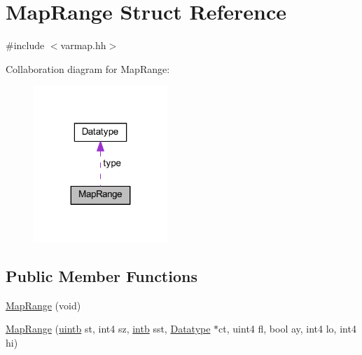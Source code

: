 \hypertarget{struct_map_range}{}\section{Map\+Range Struct Reference}
\label{struct_map_range}


{\ttfamily \#include $<$varmap.\+hh$>$}



Collaboration diagram for Map\+Range\+:
\nopagebreak
\begin{figure}[H]
\begin{center}
\leavevmode
\includegraphics[width=143pt]{struct_map_range__coll__graph}
\end{center}
\end{figure}
\subsection*{Public Member Functions}
\begin{DoxyCompactItemize}
\item 
\mbox{\hyperlink{struct_map_range_a819c683a1de6677ad4da86f1e9d9027e}{Map\+Range}} (void)
\item 
\mbox{\hyperlink{struct_map_range_a49fce86d8908927a7e31dd3724c62e10}{Map\+Range}} (\mbox{\hyperlink{types_8h_a2db313c5d32a12b01d26ac9b3bca178f}{uintb}} st, int4 sz, \mbox{\hyperlink{types_8h_aa925ba3e627c2df89d5b1cfe84fb8572}{intb}} sst, \mbox{\hyperlink{class_datatype}{Datatype}} $\ast$ct, uint4 fl, bool ay, int4 lo, int4 hi)
\end{DoxyCompactItemize}
